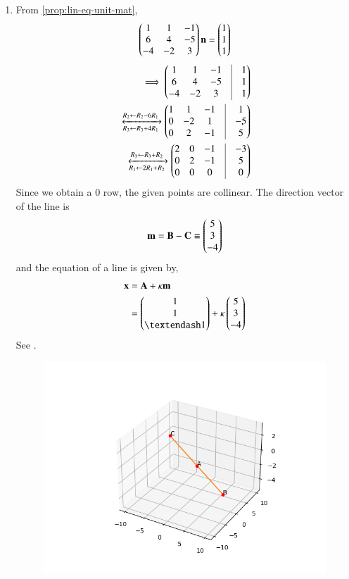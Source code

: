 \begin{enumerate}
	\item From 
		\eqref{prop:lin-eq-unit-mat},
\begin{align}
\begin{pmatrix}1&1&-1\\ 6&4&-5\\ -4&-2&3\end{pmatrix} \mathbf{n} = \begin{pmatrix}1\\1\\1\end{pmatrix}
\end{align}
\begin{align*}
	\implies \myvec{1&1&-1&\vrule&1\\6&4&-5&\vrule&1\\-4&-2&3&\vrule&1}
	\\
\xleftrightarrow[R_3 \leftarrow R_3 + 4R_1]{R_2 \leftarrow R_2 - 6R_1}
\myvec{1&1&-1&\vrule&1\\0&-2&1&\vrule&-5\\0&2&-1&\vrule&5}\\ 
\xleftrightarrow[{R_1 \leftarrow 2R_1 + R_2}] {R_3 \leftarrow R_3 + R_2}
\myvec{2&0&-1&\vrule&-3\\0&2&-1&\vrule&5\\0&0&0&\vrule&0}
\end{align*}
Since we obtain a 0 row, 
the given points are collinear.
The direction vector of the line is
\begin{align}
\mathbf{m}=\mathbf{B}-\mathbf{C} \equiv \begin{pmatrix}5\\3\\-4\end{pmatrix}
\end{align}
and the equation of a line is given by,
\begin{align}
	\vec{x}&=\vec{A}+  \kappa\vec{m}\\
&= \myvec{1\\1\\– 1} + \kappa \myvec{5\\3\\-4}
\end{align}
See 
     .
\begin{figure}[h!]
  \centering
   \includegraphics[width=\columnwidth]{chapters/12/11/3/6/figs/collinear_points.png}

\end{figure}
\end{enumerate}
